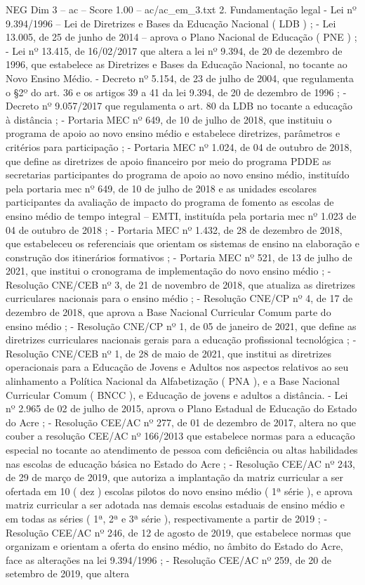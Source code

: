 \begin{textsample}{NEG Dim 3 – ac – Score 1.00 – ac/ac\_em\_3.txt}  \label{ex:f3_neg_268}
2.
Fundamentação legal - Lei nº 9.394/1996 – Lei de Diretrizes e Bases da Educação Nacional ( LDB ) ; - Lei 13.005, de 25 de junho de 2014 – aprova o Plano Nacional de Educação ( PNE ) ; - Lei nº 13.415, de 16/02/2017 que altera a lei nº 9.394, de 20 de dezembro de 1996, que estabelece as Diretrizes e Bases da Educação Nacional, no tocante ao Novo Ensino Médio. - Decreto nº 5.154, de 23 de julho de 2004, que regulamenta o §2º do art. 36 e os artigos 39 a 41 da lei 9.394, de 20 de dezembro de 1996 ; - Decreto nº 9.057/2017 que regulamenta o art. 80 da LDB no tocante a educação à distância ; - Portaria MEC nº 649, de 10 de julho de 2018, que instituiu o programa de apoio ao novo ensino médio e estabelece diretrizes, parâmetros e critérios para participação ; - Portaria MEC nº 1.024, de 04 de outubro de 2018, que define as diretrizes de apoio financeiro por meio do programa PDDE as secretarias participantes do programa de apoio ao novo ensino médio, instituído pela portaria mec nº 649, de 10 de julho de 2018 e as unidades escolares participantes da avaliação de impacto do programa de fomento as escolas de ensino médio de tempo integral – EMTI, instituída pela portaria mec nº 1.023 de 04 de outubro de 2018 ; - Portaria MEC nº 1.432, de 28 de dezembro de 2018, que estabeleceu os referenciais que orientam os sistemas de ensino na elaboração e construção dos itinerários formativos ; - Portaria MEC nº 521, de 13 de julho de 2021, que institui o cronograma de implementação do novo ensino médio ; - Resolução CNE/CEB nº 3, de 21 de novembro de 2018, que atualiza as diretrizes curriculares nacionais para o ensino médio ; - Resolução CNE/CP nº 4, de 17 de dezembro de 2018, que aprova a Base Nacional Curricular Comum parte do ensino médio ; - Resolução CNE/CP nº 1, de 05 de janeiro de 2021, que define as diretrizes curriculares nacionais gerais para a educação profissional tecnológica ; - Resolução CNE/CEB nº 1, de 28 de maio de 2021, que institui as diretrizes operacionais para a Educação de Jovens e Adultos nos aspectos relativos ao seu alinhamento a Política Nacional da Alfabetização ( PNA ), e a Base Nacional Curricular Comum ( BNCC ), e Educação de jovens e adultos a distância. - Lei nº 2.965 de 02 de julho de 2015, aprova o Plano Estadual de Educação do Estado do Acre ; - Resolução CEE/AC nº 277, de 01 de dezembro de 2017, altera no que couber a resolução CEE/AC nº 166/2013 que estabelece normas para a educação especial no tocante ao atendimento de pessoa com deficiência ou altas habilidades nas escolas de educação básica no Estado do Acre ; - Resolução CEE/AC nº 243, de 29 de março de 2019, que autoriza a implantação da matriz curricular a ser ofertada em 10 ( dez ) escolas pilotos do novo ensino médio ( 1ª série ), e aprova matriz curricular a ser adotada nas demais escolas estaduais de ensino médio e em todas as séries ( 1ª, 2ª e 3ª série ), respectivamente a partir de 2019 ; - Resolução CEE/AC nº 246, de 12 de agosto de 2019, que estabelece normas que organizam e orientam a oferta do ensino médio, no âmbito do Estado do Acre, face as alterações na lei 9.394/1996 ; - Resolução CEE/AC nº 259, de 20 de setembro de 2019, que altera 
\end{textsample}
